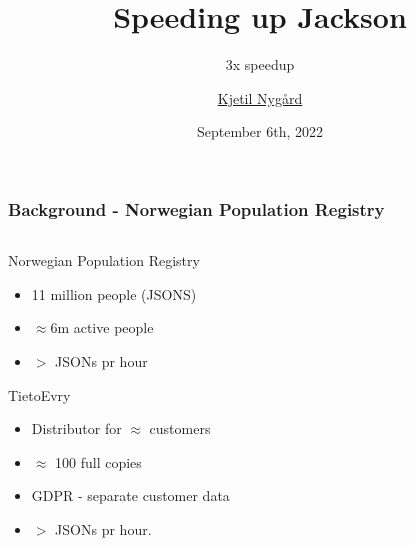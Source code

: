 \documentclass{beamer}
\title{Speeding up Jackson}
\subtitle{3x speedup}
\author{\href{pulk.hesten@gmail.com}{Kjetil Nygård}}
\institute{TietoEvry}
\date{September 6th, 2022}
\begin{document}
    \frame{\titlepage}

    \begin{frame}
        \frametitle{Background - Norwegian Population Registry}
        \begin{columns}[c]
            \begin{column}{.58\textwidth}
                \begin{block}{Norwegian Population Registry}
                    \begin{itemize}
                        \item 11 million people (JSONS)
                        \item $\approx 6$m active people
                        \item $>$  JSONs pr hour
                    \end{itemize}
                \end{block}
                \begin{block}{TietoEvry}
                    \begin{itemize}
                        \item Distributor for $\approx$ customers
                        \item $\approx$ 100 full copies
                        \item GDPR - separate customer data
                        \item $>$  JSONs pr hour.
                    \end{itemize}
                \end{block}
            \end{column}
            \begin{column}{.32\textwidth}
                \begin{center}

\end{center}
\end{column}
\end{columns}
\end{frame}
\end{document}
